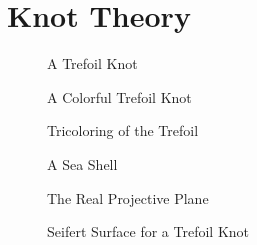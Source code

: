 \chapter{Knot Theory}
    \begin{figure}[H]
        \centering
        \caption{A Trefoil Knot}
        \label{fig:Trefoil_Knot}
    \end{figure}
    \begin{figure}[H]
        \centering
        \caption{A Colorful Trefoil Knot}
        \label{fig:Colorful_Trefoil_Knot}
    \end{figure}
    \begin{figure}[H]
        \centering
        \caption{Tricoloring of the Trefoil}
        \label{fig:Trefoil_Tricoloring}
    \end{figure}
    \begin{figure}[H]
        \centering
        \caption{A Sea Shell}
        \label{fig:Sea_Shell}
    \end{figure}
    \begin{figure}[H]
        \centering
        \caption{The Real Projective Plane}
        \label{fig:Real_Projective_Plane}
    \end{figure}
    \begin{figure}[H]
        \centering
        \caption{Seifert Surface for a Trefoil Knot}
        \label{fig:Seifert_Surface_Trefoil}
    \end{figure}